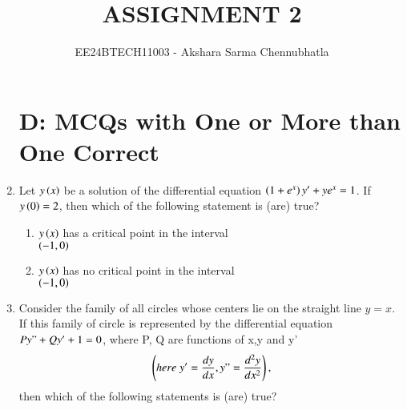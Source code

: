 \documentclass[journal,12pt,twocolumn,article]{IEEEtran}
\theoremstyle{remark}
\begin{document}
\begin{enumerate}[start = 6]

\vspace{3cm}
\title{ASSIGNMENT 2}
\author{EE24BTECH11003 - Akshara Sarma Chennubhatla}
\maketitle
\newpage
\bigskip
\section*{D: MCQs with One or More than One Correct}
\item Let $y\left(x\right)$ be a solution of the differential equation $\left(1+e^x\right)y' + ye^x = 1$. If $y\left(0\right) = 2$, then which of the following statement is (are) true?
\hfill{}
\begin{enumerate}
\item $y\left(x\right)$ has a critical point in the interval \\ $\left(-1,0\right)$
\item $y\left(x\right)$ has no critical point in the interval \\ $\left(-1,0\right)$
\end{enumerate}
\item Consider the family of all circles whose centers lie on the straight line $y = x$. If this family of circle is represented by the differential equation $Py" + Qy' + 1 = 0$, where P, Q are functions of x,y and y'
\begin{align*}
\left(here\;y' = \frac{dy}{dx}, y" = \frac{d^2y}{dx^2}\right),
\end{align*} then which of the following statements is (are) true?
\hfill{}
\begin{enumerate}
\end{enumerate}
\end{enumerate}
\end{document}
